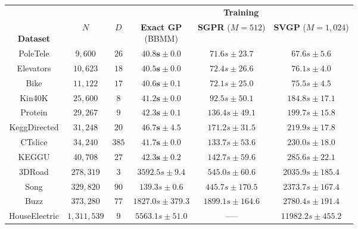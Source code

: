 \begin{tabular}{ cccccc }
  \toprule
  &&& \multicolumn{3}{c}{{\bf Training}}\\
  \cline{4-5}
  \thead{\\{\bf Dataset}} & $N$ & $D$ &
  \thead{{\bf Exact GP} \\ (BBMM)} &
  \thead{{\bf SGPR} \\ ($M\!=\!512$)} &
  \thead{{\bf SVGP} \\ ($M\!=\!1,\!024$)}
  \\
  \midrule
	PoleTele             & $9,\!600$          & $26$  &       $\mathbf{40.8s}\pm 0.0$ &      $71.6s\pm 23.7$            &       $67.6s\pm 5.6$ \\
	Elevators            & $10,\!623$         & $18$  &       $\mathbf{40.5s}\pm 0.0$ &      $72.4s\pm 26.6$            &       $76.1s\pm 4.0$ \\
	Bike                 & $11,\!122$         & $17$  &       $\mathbf{40.6s}\pm 0.1$ &      $72.1s\pm 25.0$            &       $75.5s\pm 4.5$ \\
	Kin40K               & $25,\!600$         & $8$   &       $\mathbf{41.2s}\pm 0.0$ &      $92.5s\pm 50.1$            &     $184.8s\pm 17.1$ \\
	Protein              & $29,\!267$         & $9$   &       $\mathbf{42.3s}\pm 0.1$ &     $136.4s\pm 49.1$            &     $199.7s\pm 15.8$ \\
	KeggDirected         & $31,\!248$         & $20$  &       $\mathbf{46.7s}\pm 4.5$ &     $171.2s\pm 31.5$            &     $219.9s\pm 17.8$ \\
	CTslice              & $34,\!240$         & $385$ &       $\mathbf{41.7s}\pm 0.0$ &     $133.7s\pm 53.6$            &     $230.0s\pm 18.0$ \\
	KEGGU                & $40,\!708$         & $27$  &       $\mathbf{42.3s}\pm 0.2$ &     $142.7s\pm 59.6$            &     $285.6s\pm 22.1$ \\
	3DRoad               & $278,\!319$        & $3$   &       $3592.5s\pm 9.4$       &     $\mathbf{545.0}s\pm 60.6$   &   $2035.9s\pm 185.4$  \\
	Song                 & $329,\!820$        & $90$  &      $\mathbf{139.3}s\pm 0.6$ &    $445.7s\pm 170.5$            &   $2373.7s\pm 167.4$ \\
  Buzz                 & $373,\!280$        & $77$  &  $\mathbf{1827.0}s\pm 379.3$ &   $1899.1s\pm 164.6$            &   $2780.4s\pm 191.4$  \\
	HouseElectric        & $1,\!311,\!539$    & $9$   &     $\mathbf{5563.1}s\pm 51.0$ &   -----                        &  $11982.2s\pm 455.2$ \\
  \bottomrule
\end{tabular}
